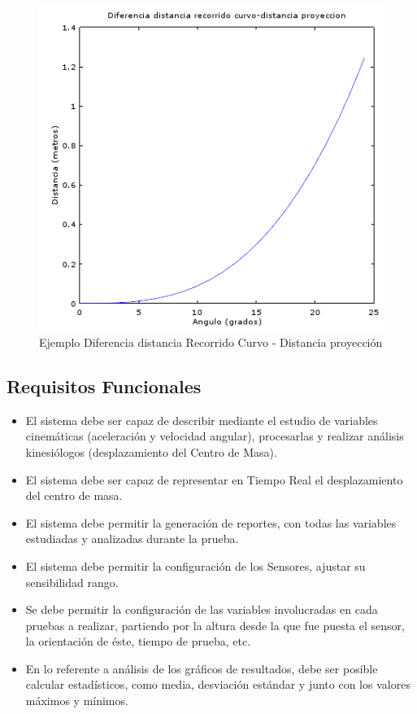 \documentclass[12pt,a4paper]{article}
\begin{document}
\begin{figure}[H]
	\centering
	\includegraphics[scale=0.8]{images/DiferenciaRec-Pro}
	\caption{Ejemplo Diferencia distancia Recorrido Curvo - Distancia proyección}
	\label{fig:diferenciarec-pro}
\end{figure}


\subsection{Requisitos Funcionales}
\begin{itemize}
	\item El sistema debe ser capaz de describir mediante el estudio de variables cinemáticas (aceleración y velocidad angular), procesarlas y realizar análisis kinesiólogos (desplazamiento del Centro de Masa).
	\item El sistema debe ser capaz de representar en Tiempo Real el desplazamiento del centro de masa.
	\item El sistema debe permitir la generación de reportes, con todas las variables estudiadas y analizadas durante la prueba.
	\item El sistema debe permitir la configuración de los Sensores, ajustar su sensibilidad rango.
	\item Se debe permitir la configuración de las variables involucradas en cada pruebas a realizar, partiendo por la altura desde la que fue puesta el sensor, la orientación de éste, tiempo de prueba, etc.
	\item En lo referente a análisis de los gráficos de resultados, debe ser posible calcular estadísticos, como media, desviación estándar y junto con los valores máximos y mínimos.
\end{itemize} 
\end{document}
